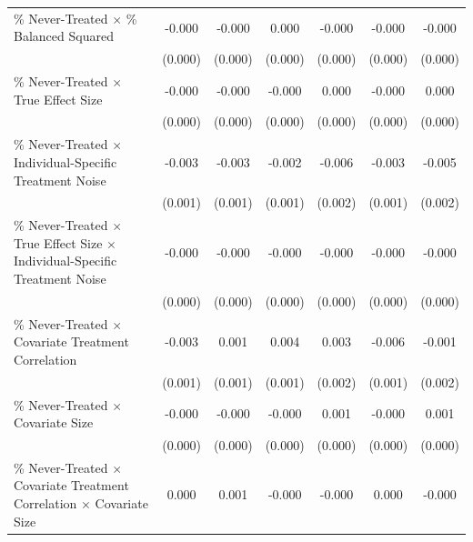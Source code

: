 \documentclass[12pt]{article}
\begin{document}
\begin{table}[htbp]
{\begin{tabular}{p{4.5in}|*{6}{c}}
\% Never-Treated $\times$ \% Balanced Squared&      -0.000\sym{***}&      -0.000\sym{**} &       0.000         &      -0.000\sym{***}&      -0.000         &      -0.000\sym{***}\\
                    &     (0.000)         &     (0.000)         &     (0.000)         &     (0.000)         &     (0.000)         &     (0.000)         \\
\% Never-Treated $\times$ True Effect Size&      -0.000         &      -0.000         &      -0.000         &       0.000         &      -0.000         &       0.000         \\
                    &     (0.000)         &     (0.000)         &     (0.000)         &     (0.000)         &     (0.000)         &     (0.000)         \\
\% Never-Treated $\times$ Individual-Specific Treatment Noise&      -0.003\sym{***}&      -0.003\sym{***}&      -0.002\sym{***}&      -0.006\sym{***}&      -0.003\sym{***}&      -0.005\sym{***}\\
                    &     (0.001)         &     (0.001)         &     (0.001)         &     (0.002)         &     (0.001)         &     (0.002)         \\
\% Never-Treated $\times$ True Effect Size $\times$ Individual-Specific Treatment Noise&      -0.000         &      -0.000         &      -0.000         &      -0.000         &      -0.000         &      -0.000         \\
                    &     (0.000)         &     (0.000)         &     (0.000)         &     (0.000)         &     (0.000)         &     (0.000)         \\
\% Never-Treated $\times$ Covariate Treatment Correlation&      -0.003\sym{**} &       0.001         &       0.004\sym{***}&       0.003         &      -0.006\sym{***}&      -0.001         \\
                    &     (0.001)         &     (0.001)         &     (0.001)         &     (0.002)         &     (0.001)         &     (0.002)         \\
\% Never-Treated $\times$ Covariate Size&      -0.000         &      -0.000         &      -0.000         &       0.001\sym{**} &      -0.000         &       0.001\sym{*}  \\
                    &     (0.000)         &     (0.000)         &     (0.000)         &     (0.000)         &     (0.000)         &     (0.000)         \\
\% Never-Treated $\times$ Covariate Treatment Correlation $\times$ Covariate Size&       0.000         &       0.001         &      -0.000         &      -0.000         &       0.000         &      -0.000         \\

\end{tabular}}
\end{table}
\end{document}
